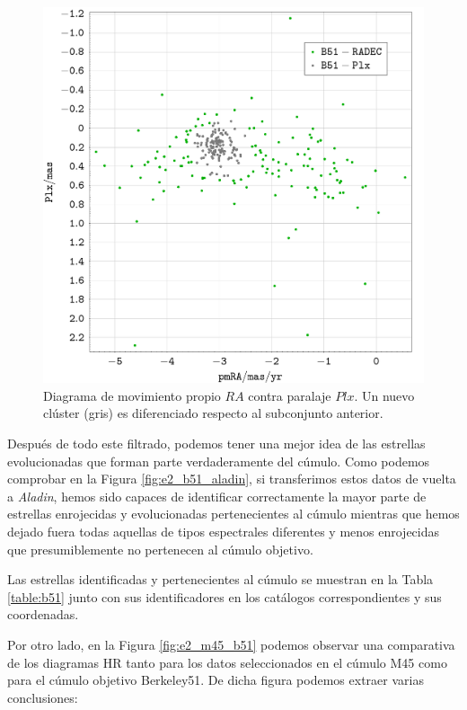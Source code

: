 \documentclass[a4paper,fleqn,usenatbib]{mnras}
\begin{document}
\begin{figure}
  \includegraphics[width=\linewidth]{img/b51_plx}
  \caption{Diagrama de movimiento propio $RA$ contra paralaje $Plx$. Un nuevo clúster (gris) es diferenciado respecto al subconjunto anterior.}
  \label{fig:e2_b51_plx}
\end{figure}

Después de todo este filtrado, podemos tener una mejor idea de las estrellas evolucionadas que forman parte verdaderamente del cúmulo. Como podemos comprobar en la Figura \ref{fig:e2_b51_aladin}, si transferimos estos datos de vuelta a \emph{Aladin}, hemos sido capaces de identificar correctamente la mayor parte de estrellas enrojecidas y evolucionadas pertenecientes al cúmulo mientras que hemos dejado fuera todas aquellas de tipos espectrales diferentes y menos enrojecidas que presumiblemente no pertenecen al cúmulo objetivo.

Las estrellas identificadas y pertenecientes al cúmulo se muestran en la Tabla \ref{table:b51} junto con sus identificadores en los catálogos correspondientes y sus coordenadas.

Por otro lado, en la Figura \ref{fig:e2_m45_b51} podemos observar una comparativa de los diagramas HR tanto para los datos seleccionados en el cúmulo M45 como para el cúmulo objetivo Berkeley51. De dicha figura podemos extraer varias conclusiones:
\end{document}
